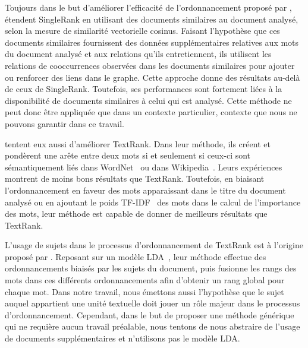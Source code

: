     Toujours dans le but d'améliorer l'efficacité de l'ordonnancement proposé
    par ,  étendent
    SingleRank en utilisant des documents similaires au document analysé, selon
    la mesure de similarité vectorielle cosinus. Faisant l'hypothèse que ces
    documents similaires fournissent des données supplémentaires relatives aux
    mots du document analysé et aux relations qu'ils entretiennent, ils
    utilisent les relations de cooccurrences observées dans les documents
    similaires pour ajouter ou renforcer des liens dans le graphe. Cette
    approche donne des résultats au-delà de ceux de SingleRank. Toutefois, ses
    performances sont fortement liées à la disponibilité de documents similaires
    à celui qui est analysé. Cette méthode ne peut donc être appliquée que dans
    un contexte particulier, contexte que nous ne pouvons garantir dans ce
    travail.

     tentent eux aussi d'améliorer
    TextRank. Dans leur méthode, ils créent et pondèrent une arête entre deux
    mots si et seulement si ceux-ci sont sémantiquement liés dans
    WordNet~\cite{miller1995wordnet} ou dans
    Wikipedia~\cite{milne2008wikipediasemanticrelatedness}. Leurs expériences
    montrent de  moins bons résultats que TextRank. Toutefois, en biaisant
    l'ordonnancement en faveur des mots apparaissant dans le titre du document
    analysé ou en ajoutant le poids TF-IDF~\cite{jones1972tfidf} des mots dans
    le calcul de l'importance des mots, leur méthode est capable de donner de
    meilleurs résultats que TextRank.

    L'usage de sujets dans le processus d'ordonnancement de TextRank est à
    l'origine proposé par . Reposant sur un
    modèle LDA~\cite[Latent Dirichlet Allocation]{blei2003lda}, leur méthode
    effectue des ordonnancements biaisés par les sujets du document, puis
    fusionne les rangs des mots dans ces différents ordonnancements afin
    d'obtenir un rang global pour chaque mot. Dans notre travail, nous émettons
    aussi l'hypothèse que le sujet auquel appartient une unité textuelle doit
    jouer un rôle majeur dans le processus d'ordonnancement. Cependant, dans le
    but de proposer une méthode générique qui ne requière aucun travail
    préalable, nous tentons de nous abstraire de l'usage de documents
    supplémentaires et n'utilisons pas le modèle LDA.

